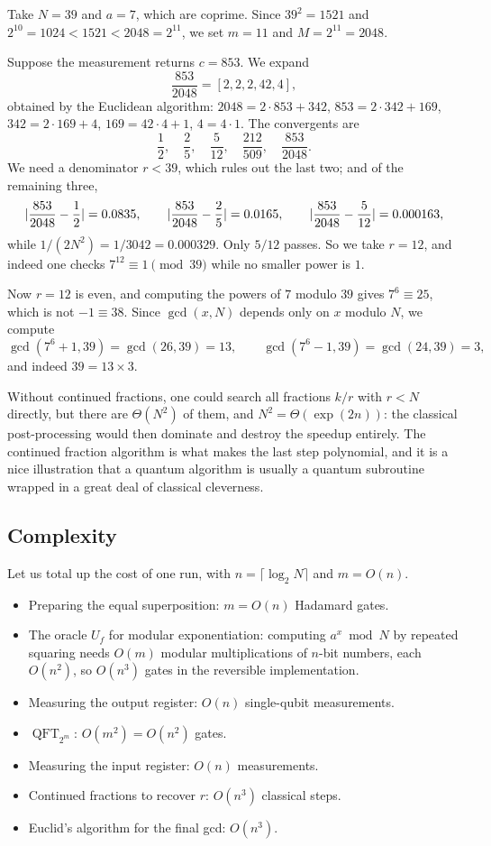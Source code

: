\documentclass[a4paper]{scrartcl}
\newcommand{\QFT}{\operatorname{QFT}}
\begin{document}
\begin{example}
	Take $N = 39$ and $a = 7$, which are coprime. Since $39^2 = 1521$ and $2^{10} = 1024 < 1521 < 2048 = 2^{11}$, we set $m = 11$ and $M = 2^{11} = 2048$.

	Suppose the measurement returns $c = 853$. We expand
	$$\frac{853}{2048} = [2,2,2,42,4],$$
	obtained by the Euclidean algorithm: $2048 = 2\cdot853+342$, $853 = 2\cdot342+169$, $342 = 2\cdot169+4$, $169 = 42\cdot4+1$, $4 = 4\cdot1$. The convergents are
	$$\frac12,\quad\frac25,\quad\frac5{12},\quad\frac{212}{509},\quad\frac{853}{2048}.$$
	We need a denominator $r<39$, which rules out the last two; and of the remaining three,
	$$\lvert\frac{853}{2048}-\frac12\rvert = 0.0835,\qquad \lvert\frac{853}{2048}-\frac25\rvert=0.0165,\qquad\lvert\frac{853}{2048}-\frac5{12}\rvert=0.000163,$$
	while $1/(2N^2) = 1/3042 = 0.000329$. Only $5/12$ passes. So we take $r = 12$, and indeed one checks $7^{12}\equiv1\pmod{39}$ while no smaller power is $1$.

	Now $r = 12$ is even, and computing the powers of $7$ modulo $39$ gives $7^6 \equiv 25$, which is not $-1\equiv38$. Since $\gcd(x,N)$ depends only on $x$ modulo $N$, we compute
	$$\gcd\left(7^6+1, 39\right) = \gcd(26,39)=13, \qquad \gcd\left(7^6-1,39\right)=\gcd(24,39)=3,$$
	and indeed $39 = 13\times3$.
\end{example}

\begin{remark}
	Without continued fractions, one could search all fractions $k/r$ with $r<N$ directly, but there are $\Theta(N^2)$ of them, and $N^2 = \Theta(\exp(2n))$: the classical post-processing would then dominate and destroy the speedup entirely. The continued fraction algorithm is what makes the last step polynomial, and it is a nice illustration that a quantum algorithm is usually a quantum subroutine wrapped in a great deal of classical cleverness.
\end{remark}

\subsection{Complexity}

Let us total up the cost of one run, with $n = \lceil\log_2 N\rceil$ and $m = O(n)$.

\begin{itemize}
	\item Preparing the equal superposition: $m = O(n)$ Hadamard gates.
	\item The oracle $U_f$ for modular exponentiation: computing $a^x\bmod N$ by repeated squaring needs $O(m)$ modular multiplications of $n$-bit numbers, each $O(n^2)$, so $O(n^3)$ gates in the reversible implementation.
	\item Measuring the output register: $O(n)$ single-qubit measurements.
	\item $\QFT_{2^m}$: $O(m^2) = O(n^2)$ gates.
	\item Measuring the input register: $O(n)$ measurements.
	\item Continued fractions to recover $r$: $O(n^3)$ classical steps.
	\item Euclid's algorithm for the final gcd: $O(n^3)$.
\end{itemize}
\end{document}
